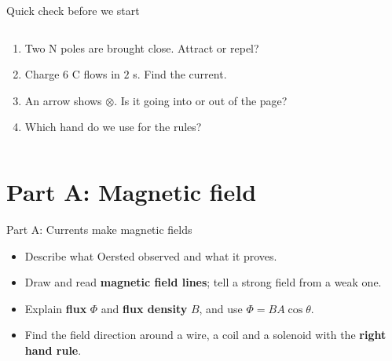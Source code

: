 \documentclass[aspectratio=169,11pt,xcolor=table]{beamer}
\begin{document}
\begin{frame}{Quick check before we start}
\small
\begin{columns}[T]
\begin{think}
\begin{enumerate}
\item Two N poles are brought close. Attract or repel?
\item Charge $6$ C flows in $2$ s. Find the current.
\item An arrow shows $\otimes$. Is it going into or out of the page?
\item Which hand do we use for the rules?
\end{enumerate}
\end{think}
\end{columns}
\end{frame}

\section{Part A: Magnetic field}
\begin{frame}{Part A: Currents make magnetic fields}
\begin{goals}
\large\begin{itemize}
\item Describe what Oersted observed and what it proves.
\item Draw and read \textbf{magnetic field lines}; tell a strong field from a weak one.
\item Explain \textbf{flux} $\Phi$ and \textbf{flux density} $B$, and use $\Phi=BA\cos\theta$.
\item Find the field direction around a wire, a coil and a solenoid with the \textbf{right hand rule}.
\end{itemize}
\end{goals}
\end{frame}
\end{document}
